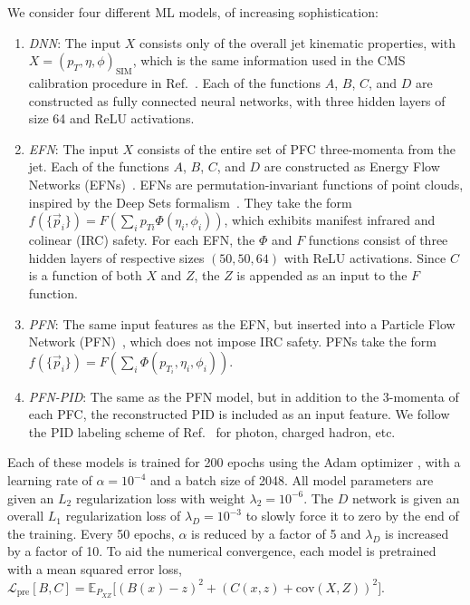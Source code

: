 \documentclass[prl,twocolumn,superscriptaddress,longbibliography,preprintnumbers,floatfix,nofootinbib]{revtex4-1}
\DeclareRobustCommand{\Ref}[1]{Ref.~\cite{#1}}
\newcommand{\Adam}{{\sc Adam}\xspace}
\begin{document}
We consider four different ML models, of increasing sophistication:
%
\begin{enumerate}
    \item \textit{DNN}:
    The input $X$ consists only of the overall jet kinematic properties, with $X = (p_T, \eta, \phi)_\text{SIM}$, which is the same information used in the CMS calibration procedure in \Ref{Khachatryan_2017}.
    Each of the functions $A$, $B$, $C$, and $D$ are constructed as fully connected neural networks, with three hidden layers of size 64 and ReLU activations.
    \item \textit{EFN}:
    The input $X$ consists of the entire set of PFC three-momenta from the jet.
    Each of the functions $A$, $B$, $C$, and $D$ are constructed as Energy Flow Networks (EFNs)~\cite{Komiske_2019}.
    EFNs are permutation-invariant functions of point clouds, inspired by the Deep Sets formalism~\cite{NIPS2017_f22e4747}.
    They take the form $f(\{\Vec{p}_i\}) = F\left(\sum_i p_{Ti} \Phi(\eta_i,\phi_i)\right)$, which exhibits manifest infrared and colinear (IRC) safety.
    For each EFN, the $\Phi$ and $F$ functions consist of three hidden layers of respective sizes $(50,50,64)$ with ReLU activations.
    Since $C$ is a function of both $X$ and $Z$, the $Z$ is appended as an input to the $F$ function.
    \item \textit{PFN}: The same input features as the EFN, but inserted into a Particle Flow Network (PFN)~\cite{NIPS2017_f22e4747,Komiske_2019}, which does not impose IRC safety.
    PFNs take the form $f(\{\Vec{p}_i\}) = F\left(\sum_i  \Phi(p_{T_i}, \eta_i,\phi_i)\right)$. 
    \item \textit{PFN-PID}: The same as the PFN model, but in addition to the 3-momenta of each PFC, the reconstructed PID is included as an input feature.
    We follow the PID labeling scheme of \Ref{Komiske_2019} for photon, charged hadron, etc.
\end{enumerate}
%
Each of these models is trained for 200 epochs using the \Adam optimizer \cite{kingma2017adam}, with a learning rate of $\alpha = 10^{-4}$ and a batch size of 2048.
%
All model parameters are given an $L_2$ regularization loss with weight $\lambda_2 = 10^{-6}$.
%
The $D$ network is given an overall $L_1$ regularization loss of $\lambda_D = 10^{-3}$ to slowly force it to zero by the end of the training. 
%
Every 50 epochs, $\alpha$ is reduced by a factor of 5 and $\lambda_D$ is increased by a factor of 10.
%
To aid the numerical convergence, each model is pretrained with a mean squared error loss, $\mathcal{L}_{\text{pre}}[B,C] = \mathbb{E}_{P_{XZ}} \big[ (B(x)-z)^2 + (C(x,z) +  \text{cov}(X,Z))^2 \big]$.
\end{document}
